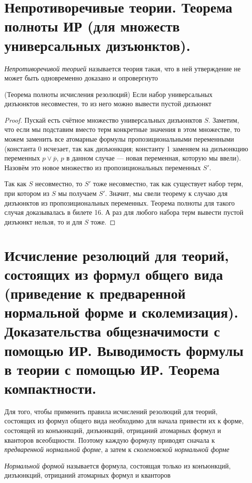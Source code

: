 \documentclass{article}
\begin{document}
\section{Непротиворечивые теории. Теорема полноты ИР (для множеств универсальных дизъюнктов).}
\begin{definition}
	\textit{Непротиворечивой теорией} называется теория такая, что в ней утверждение не может быть одновременно доказано и опровергнуто
\end{definition}

\begin{theorem}{(Теорема полноты исчисления резолюций)}
	Если набор универсальных дизъюнктов несовместен, то из него можно вывести пустой дизъюнкт
\end{theorem}
\begin{proof}
	Пускай есть счётное множество универсальных дизъюнктов $S$. Заметим, что если мы подставим вместо терм конкретные значения в этом множестве, то можем заменить все атомарные формулы пропозициональными переменными (константа 0 исчезает, так как дизъюнкция; константу 1 заменяем на дизъюнкцию переменных $p \vee \overline p$, $p$ в данном случае --- новая переменная, которую мы ввели). Назовём это новое множество из пропозициональных переменных $S'$.

	Так как $S$ несовместно, то $S'$ тоже несовместно, так как существует набор терм, при котором из $S$ мы получаем $S'$. Значит, мы свели теорему к случаю для дизъюнктов из пропозициональных переменных. Теорема полноты для такого случая доказывалась в билете 16. А раз для любого набора терм вывести пустой дизъюнкт нельзя, то и для $S$ тоже.
\end{proof}

\section{Исчисление резолюций для теорий, состоящих из формул общего вида (приведение к предваренной нормальной форме и сколемизация). Доказательства общезначимости с помощью ИР. Выводимость формулы в теории с помощью ИР. Теорема компактности.}
Для того, чтобы применить правила исчислений резолюций для теорий, состоящих из формул общего вида необходимо для начала привести их к форме, состоящей из конъюнкций, дизъюнкций, отрицаний атомарных формул и кванторов всеобщности. Поэтому каждую формулу приводят сначала к \textit{предваренной нормальной форме}, а затем к \textit{сколемовской нормальной форме}

\begin{definition}
	\textit{Нормальной формой} называется формула, состоящая только из конъюнкций, дизъюнкций, отрицаний атомарных формул и кванторов
\end{definition}
\end{document}
